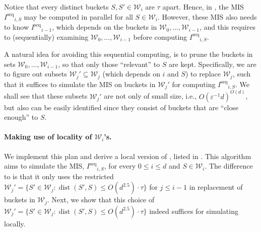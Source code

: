 \documentclass[11pt,letterpaper]{article}
\theoremstyle{plain}
\theoremstyle{definition}
\theoremstyle{remark}
\DeclareMathOperator{\dist}{dist}
\newcommand{\Iseq}{\ensuremath{I^{\mathrm{seq}}}\xspace}
\begin{document}
Notice that every distinct buckets $S, S' \in \mathcal{W}_i$ are $\tau$ apart.
Hence, in , the MIS $\Iseq_{i,S}$ may be computed in parallel for all $S \in \mathcal{W}_i$.
However, these MIS also needs to know $\Iseq_{i - 1}$, which depends on the buckets in $\mathcal{W}_0, \ldots, \mathcal{W}_{i - 1}$,
and this requires to (sequentially) examining $\mathcal{W}_0, \ldots, \mathcal{W}_{i - 1}$ before computing $\Iseq_{i ,S}$.

A natural idea for avoiding this sequential computing, is to prune the buckets in sets $\mathcal{W}_0, \ldots, \mathcal{W}_{i - 1}$, so that only those ``relevant'' to $S$ are kept. 
Specifically, we are to figure out subsets $\mathcal{W}_j' \subseteq \mathcal{W}_j$ (which depends on $i$ and $S$) to replace $\mathcal{W}_j$, such that it suffices to simulate the MIS on buckets in $\mathcal{W}_j'$ for computing $\Iseq_{i, S}$. 
We shall see that these subsets $\mathcal{W}_j'$ are not only of small size, i.e., $O(\varepsilon^{-1}d)^{O(d)}$, but also can be easily identified since they consist of buckets that are ``close enough'' to $S$.


\paragraph{Making use of locality of $\mathcal{W}_i$'s.}
We implement this plan and derive a local version of , listed in . 
This algorithm aims to simulate the MIS, $\Iseq_{i, S}$, for every $0 \leq i \leq d$ and $S \in \mathcal{W}_i$. 
The difference to  is that it only uses the restricted 
$\mathcal{W}_j' = \{ S' \in \mathcal{W}_j : \dist(S', S) \leq O(d^{2.5}) \cdot \tau \}$ for $j \leq i - 1$ in replacement of buckets in $\mathcal{W}_j$. 
Next, we show that this choice of  $\mathcal{W}_j' = \{ S' \in \mathcal{W}_j : \dist(S', S) \leq O(d^{2.5}) \cdot \tau \}$ indeed suffices for simulating  locally.
\end{document}
